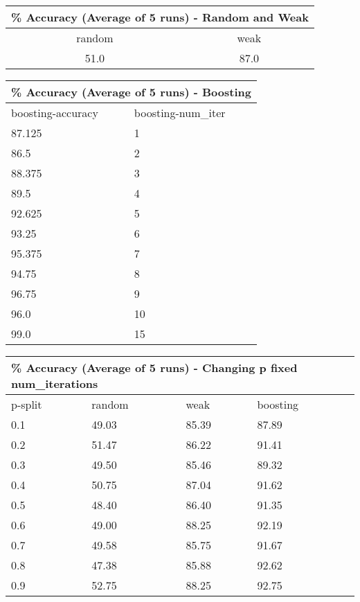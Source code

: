 
\begin{table}[]
\begin{tabular}{c c}
 \multicolumn{2}{l}{\% Accuracy (Average of 5 runs) - Random and Weak} \\
 \hline
random & weak\\
51.0 & 87.0 \\
\hline
\end{tabular}
\end{table}

\begin{table}[]
\begin{tabular}{ll}
 \multicolumn{2}{l}{\% Accuracy (Average of 5 runs) - Boosting} \\
 \hline
boosting-accuracy & boosting-num\_iter \\
87.125 & 1 \\
86.5 & 2 \\
88.375 & 3 \\
89.5 & 4 \\
92.625 & 5 \\
93.25 & 6 \\
95.375 & 7 \\
94.75 & 8 \\
96.75 & 9 \\
96.0 & 10 \\
99.0 & 15 \\
\hline
\end{tabular}
\end{table}

\begin{table}[]
\begin{tabular}{llll}
 \multicolumn{4}{l}{\% Accuracy (Average of 5 runs) - Changing p fixed num\_iterations} \\
 \hline
p-split & random & weak & boosting \\
0.1 & 49.03 & 85.39 & 87.89 \\
0.2 & 51.47 & 86.22 & 91.41 \\
0.3 & 49.50 & 85.46 & 89.32 \\
0.4 & 50.75 & 87.04 & 91.62 \\
0.5 & 48.40 & 86.40 & 91.35 \\
0.6 & 49.00 & 88.25 & 92.19 \\
0.7 & 49.58 & 85.75 & 91.67 \\
0.8 & 47.38 & 85.88 & 92.62 \\
0.9 & 52.75 & 88.25 & 92.75 \\
 \hline
\end{tabular}
\end{table}
